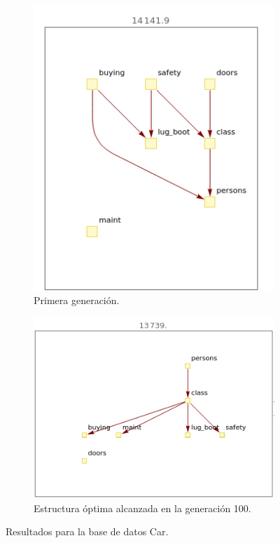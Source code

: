 \documentclass[10pt,a4paper]{article}
\begin{document}
\begin{figure}[htb!]
\begin{subfigure}[b]{0.475\textwidth}
            \includegraphics[width=\textwidth]{img/car/first.png}
            \caption[ ]{{Primera generación.}}
        \end{subfigure}
        \hfill
        \begin{subfigure}[b]{0.475\textwidth}
            \centering 
            \includegraphics[width=\textwidth]{img/car/best.png}
            \caption[ ]{{Estructura óptima alcanzada en la generación 100.}}
        \end{subfigure}

\caption{Resultados para la base de datos Car.}
\label{fig:car_results}
\end{figure}
\end{document}
